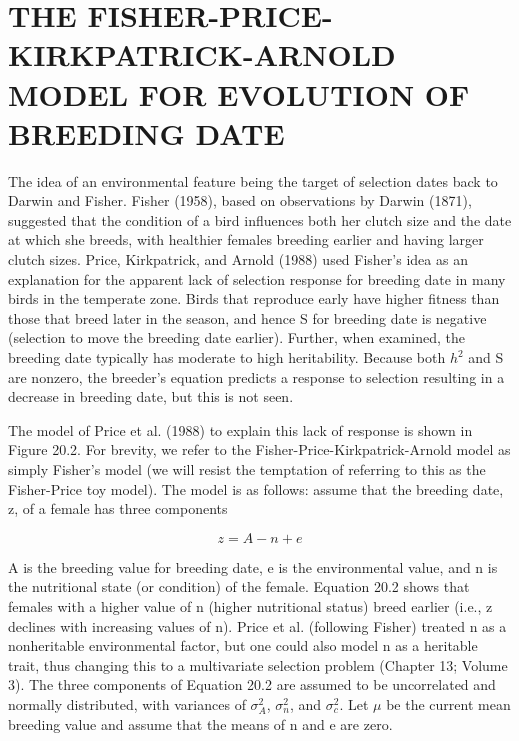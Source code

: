 \documentclass{article}
\begin{document}
\section{THE FISHER-PRICE-KIRKPATRICK-ARNOLD MODEL FOR EVOLUTION OF BREEDING DATE}
The idea of an environmental feature being the target of selection dates back to Darwin and Fisher. Fisher (1958), based on observations by Darwin (1871), suggested that the condition of a bird influences both her clutch size and the date at which she breeds, with healthier females breeding earlier and having larger clutch sizes. Price, Kirkpatrick, and Arnold (1988) used Fisher's idea as an explanation for the apparent lack of selection response for breeding date in many birds in the temperate zone. Birds that reproduce early have higher fitness than those that breed later in the season, and hence S for breeding date is negative (selection to move the breeding date earlier). Further, when examined, the breeding date typically has moderate to high heritability. Because both  $ h^{2} $ and S are nonzero, the breeder's equation predicts a response to selection resulting in a decrease in breeding date, but this is not seen.

The model of Price et al. (1988) to explain this lack of response is shown in Figure 20.2. For brevity, we refer to the Fisher-Price-Kirkpatrick-Arnold model as simply Fisher's model (we will resist the temptation of referring to this as the Fisher-Price toy model). The model is as follows: assume that the breeding date, z, of a female has three components

\begin{equation}
z=A-n+e
\tag{20.2}
\label{eq:20_2}
\end{equation}

A is the breeding value for breeding date, e is the environmental value, and n is the nutritional state (or condition) of the female. Equation 20.2 shows that females with a higher value of n (higher nutritional status) breed earlier (i.e., z declines with increasing values of n). Price et al. (following Fisher) treated n as a nonheritable environmental factor, but one could also model n as a heritable trait, thus changing this to a multivariate selection problem (Chapter 13; Volume 3). The three components of Equation 20.2 are assumed to be uncorrelated and normally distributed, with variances of  $ \sigma_A^2 $,  $ \sigma_n^2 $, and  $ \sigma_c^2 $. Let  $ \mu $ be the current mean breeding value and assume that the means of n and e are zero.
\end{document}
